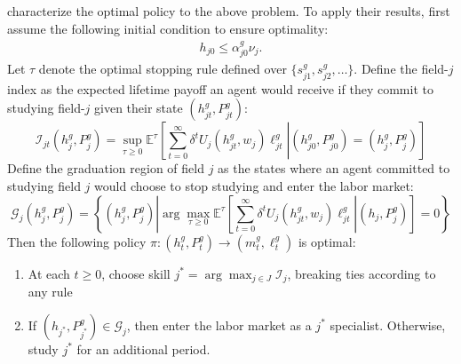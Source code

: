 \documentclass[11 pt]{article}
\newcommand{\toedit}[1]{{\color{gray}#1}}
\newcommand{\toedit}[1]{#1}
\newcommand{\ce}[2]{\left[\left. #1 \right\vert #2 \right]}
\newcommand{\study}{m} %
\begin{document}
\textcite{AF20} characterize the optimal policy to the above problem.
\toedit{To apply their results, first assume the following initial condition to ensure optimality:}
\begin{align}
    h_{j0} \leq \alpha_{j0}^g \nu_{j}. \label{eq:h_leq_alpha_v}
\end{align} 
Let $\tau$ denote the optimal stopping rule defined over $\{s_{j1}^g, s_{j2}^g, \dots\}$. 
Define the field-$j$ index as the expected lifetime payoff an agent would receive if they commit to studying field-$j$ given their state $(h_{jt}^g, P_{jt}^g)$: 
\begin{equation}\label{eq:index_general}
\mathcal{I}_{jt} (h_{j}^g, P_{j}^g) = \sup_{\tau \geq 0} \mathbb{E}^\tau
\ce{
   \sum_{t=0}^\infty \delta^t 
   U_j(h_{jt}^g, w_j) \ell_{jt}^g
}{
    (h_{j0}^g, P_{j0}^g) = (h_{j}^g, P_{j}^g)
}
\end{equation}
Define the graduation region of field $j$ as the states where an agent committed to studying field $j$ would choose to stop studying and enter the labor market: 
\begin{equation}\label{eq:graduation_general}
\mathcal{G}_j (h_{j}^g, P_{j}^g)  = 
    \left\{
        (h_{j}^g, P_{j}^g) 
        \left\vert
            \arg \max_{\tau \geq 0} 
            \mathbb{E}^\tau 
            \ce{
                \sum_{t=0}^\infty \delta^t 
                U_j(h_{jt}^g, w_j) \ell_{jt}^g
            }{
                (h_j, P_j^g)
            } = 0
   \right. \right\}
\end{equation}
Then the following policy $\pi: (h_{t}^g, P_{t}^g) \to (\study_{t}^g, \ell_t^g)$ is optimal: 
\begin{enumerate}
    \item At each $t \geq 0$, choose skill $j^* = \arg \max_{j \in J} \mathcal{I}_j$, breaking ties according to any rule
    \item If $(h_{j^*}, P_{j^*}^g) \in \mathcal{G}_{j}$, then enter the labor market as a $j^*$ specialist. Otherwise, study $j^*$ for an additional period.  
\end{enumerate}


\end{document}
